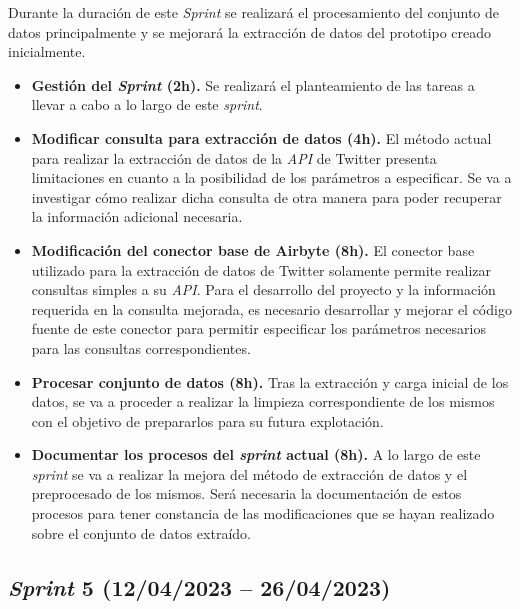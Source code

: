 Durante la duración de este \textit{Sprint} se realizará el procesamiento del conjunto de datos principalmente y se mejorará la extracción de datos del prototipo creado inicialmente.

\begin{itemize}

    \item \textbf{Gestión del \textit{Sprint} (2h).} Se realizará el planteamiento de las tareas a llevar a cabo a lo largo de este \textit{sprint}.

    \item \textbf{Modificar consulta para extracción de datos (4h).} El método actual para realizar la extracción de datos de la \textit{API} de Twitter presenta limitaciones en cuanto a la posibilidad de los parámetros a especificar. Se va a investigar cómo realizar dicha consulta de otra manera para poder recuperar la información adicional necesaria.

    \item \textbf{Modificación del conector base de Airbyte (8h).} El conector base utilizado para la extracción de datos de Twitter solamente permite realizar consultas simples a su \textit{API}. Para el desarrollo del proyecto y la información requerida en la consulta mejorada, es necesario desarrollar y mejorar el código fuente de este conector para permitir especificar los parámetros necesarios para las consultas correspondientes.

    \item \textbf{Procesar conjunto de datos (8h).} Tras la extracción y carga inicial de los datos, se va a proceder a realizar la limpieza correspondiente de los mismos con el objetivo de prepararlos para su futura explotación.

    \item \textbf{Documentar los procesos del \textit{sprint} actual (8h).} A lo largo de este \textit{sprint} se va a realizar la mejora del método de extracción de datos y el preprocesado de los mismos. Será necesaria la documentación de estos procesos para tener constancia de las modificaciones que se hayan realizado sobre el conjunto de datos extraído.

\end{itemize}

\subsection{\textit{Sprint} 5 (12/04/2023 -- 26/04/2023)}

